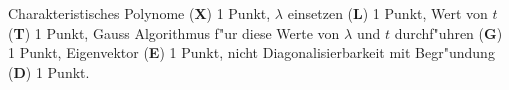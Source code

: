 \begin{bewertung}
Charakteristisches Polynome ({\bf X}) 1 Punkt,
$\lambda$ einsetzen ({\bf L}) 1 Punkt,
Wert von $t$ ({\bf T}) 1 Punkt,
Gauss Algorithmus f"ur diese Werte von $\lambda$ und $t$ durchf"uhren
({\bf G}) 1 Punkt,
Eigenvektor ({\bf E}) 1 Punkt,
nicht Diagonalisierbarkeit mit Begr"undung ({\bf D}) 1 Punkt.
\end{bewertung}



